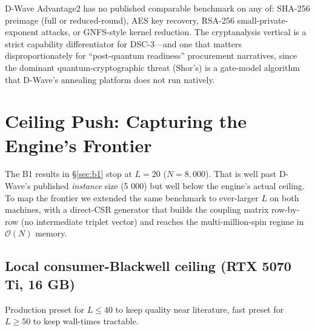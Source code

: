 \documentclass[11pt,a4paper]{article}
\begin{document}
D-Wave Advantage2 has no published comparable benchmark on any of:
SHA-256 preimage (full or reduced-round), AES key recovery, RSA-256
small-private-exponent attacks, or GNFS-style kernel reduction. The
cryptanalysis vertical is a strict capability differentiator for
DSC-3---and one that matters disproportionately for ``post-quantum
readiness'' procurement narratives, since the dominant
quantum-cryptographic threat (Shor's) is a gate-model algorithm that
D-Wave's annealing platform does not run natively.

\section{Ceiling Push: Capturing the Engine's Frontier}
\label{sec:ceiling}

The B1 results in §\ref{sec:b1} stop at $L\!=\!20$ ($N\!=\!8{,}000$). That
is well past D-Wave's published \emph{instance} size (5 000) but well below
the engine's actual ceiling. To map the frontier we extended the same
benchmark to ever-larger $L$ on both machines, with a direct-CSR generator
that builds the coupling matrix row-by-row (no intermediate triplet vector)
and reaches the multi-million-spin regime in $\mathcal{O}(N)$ memory.

\subsection{Local consumer-Blackwell ceiling (RTX 5070 Ti, 16 GB)}

Production preset for $L\!\le\!40$ to keep quality near literature, fast
preset for $L\!\ge\!50$ to keep wall-times tractable.
\end{document}

